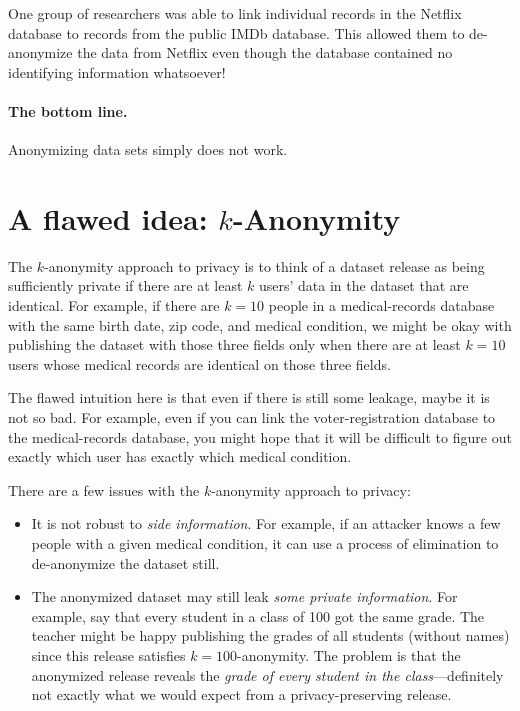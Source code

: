 One group of researchers was able to link individual records in the Netflix database to records from the public IMDb database. This allowed them to de-anonymize the data from Netflix even though the database contained no identifying information whatsoever!

\paragraph{The bottom line.}
Anonymizing data sets simply does not work.


\section{A flawed idea: $k$-Anonymity}

The $k$-anonymity approach to privacy is to think of a dataset release as
being sufficiently private if there are at least $k$ users' data in the dataset
that are identical.
For example, if there are $k=10$ people in a medical-records database with 
the same birth date, zip code, and medical condition, 
we might be okay with publishing the dataset with those three fields
only when there are at least $k=10$ users whose medical records
are identical on those three fields.

The flawed intuition here is that even if there is still some leakage, maybe
it is not so bad.
For example, even if you can link the voter-registration database to the 
medical-records database, you might hope that it will be difficult to
figure out exactly which user has exactly which medical condition.

There are a few issues with the $k$-anonymity approach to privacy:
\begin{itemize}
  \item It is not robust to \emph{side information}.
        For example, if an attacker knows a few people with 
        a given medical condition, it can use a process of elimination
        to de-anonymize the dataset still.
  \item The anonymized dataset may still leak \emph{some private information}.
        For example, say that every student in a class of 100 got the same grade.
        The teacher might be happy publishing the grades of all students (without names)
        since this release satisfies $k=100$-anonymity.
        The problem is that the anonymized release reveals the \emph{grade of every student
        in the class}---definitely not exactly what we would expect from a privacy-preserving
        release.
\end{itemize}

